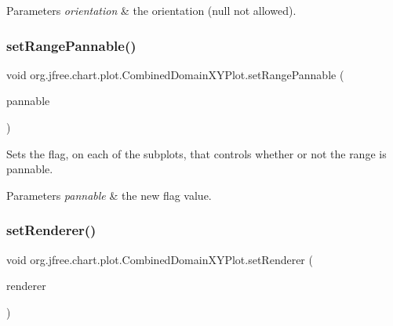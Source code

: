 \begin{DoxyParams}{Parameters}
{\em orientation} & the orientation ({\ttfamily null} not allowed). \\
\hline
\end{DoxyParams}
\mbox{\label{classorg_1_1jfree_1_1chart_1_1plot_1_1_combined_domain_x_y_plot_a56eb179a062b905934822aed6a605e02}} 
\subsubsection{\texorpdfstring{set\+Range\+Pannable()}{setRangePannable()}}
{\footnotesize\ttfamily void org.\+jfree.\+chart.\+plot.\+Combined\+Domain\+X\+Y\+Plot.\+set\+Range\+Pannable (\begin{DoxyParamCaption}\item[{boolean}]{pannable }\end{DoxyParamCaption})}

Sets the flag, on each of the subplots, that controls whether or not the range is pannable.


\begin{DoxyParams}{Parameters}
{\em pannable} & the new flag value. \\
\hline
\end{DoxyParams}
\mbox{\label{classorg_1_1jfree_1_1chart_1_1plot_1_1_combined_domain_x_y_plot_ae97dc70e30502e51dde75091d449c49b}} 
\subsubsection{\texorpdfstring{set\+Renderer()}{setRenderer()}}
{\footnotesize\ttfamily void org.\+jfree.\+chart.\+plot.\+Combined\+Domain\+X\+Y\+Plot.\+set\+Renderer (\begin{DoxyParamCaption}\item[{\mbox{\hyperlink{interfaceorg_1_1jfree_1_1chart_1_1renderer_1_1xy_1_1_x_y_item_renderer}{X\+Y\+Item\+Renderer}}}]{renderer }\end{DoxyParamCaption})}

